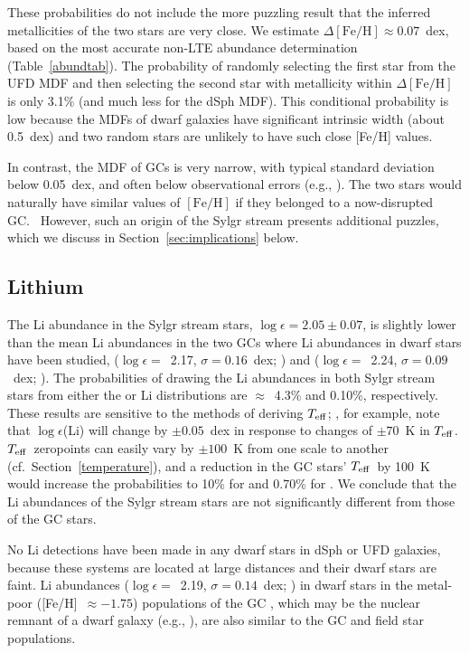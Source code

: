 \documentclass[twocolumn,tighten]{aastex62}
\newcommand{\feh}{{\mathrm{[Fe/H]}}}
\newcommand{\teff}{\mbox{$T_{\rm eff}$}}
\begin{document}
These probabilities do not include the more puzzling result that the inferred metallicities of the two stars are very close. We estimate $\Delta\feh \approx 0.07$~dex, based on the most accurate non-LTE abundance determination (Table~\ref{abundtab}). The probability of randomly selecting the first star from the UFD MDF and then selecting the second star with metallicity within $\Delta\feh$ is only 3.1\% (and much less for the dSph MDF).
This conditional probability is low because the MDFs of dwarf galaxies have significant intrinsic width (about 0.5~dex) and two random stars are unlikely to have such close [Fe/H] values.

In contrast, the MDF of GCs is very narrow, 
with typical standard deviation below 0.05~dex,
and often below observational errors
(e.g., \citealt{carretta09feh}). 
The two stars would naturally have similar values of $\feh$ 
if they belonged to a now-disrupted GC.~ 
However, such an origin of the Sylgr stream presents additional puzzles, which we discuss in Section~\ref{sec:implications} below.


\subsection{Lithium}
\label{clueslithium}


The Li abundance in the Sylgr stream stars,
$\log\epsilon = 2.05 \pm 0.07$,
is slightly lower than the mean Li abundances in the two 
GCs where Li abundances in dwarf stars have been studied,
($\log\epsilon =$~2.17, $\sigma = 0.16$~dex; \citealt{gruyters16})
and
($\log\epsilon =$~2.24, $\sigma = 0.09$~dex; \citealt{lind09n6397}).
The probabilities of drawing the Li abundances in both 
Sylgr stream stars from either the 
 or
Li distributions are $\approx$~4.3\% and 0.10\%, respectively.
These results are sensitive to the 
methods of deriving \teff;
\citet{charbonnel05}, for example, note that 
$\log\epsilon$(Li) will change by $\pm 0.05$~dex
in response to changes of $\pm 70$~K in \teff.
\teff\ zeropoints can easily vary by $\pm 100$~K 
from one scale to another
(cf.\ Section~\ref{temperature}), 
and a reduction in the GC stars' 
\teff\ by 100~K would increase the 
probabilities to 10\% for
 and 0.70\% for 
.
We conclude that the Li abundances of the Sylgr stream stars
are not significantly different from those of the GC stars.

No Li detections have been made in any 
dwarf stars in dSph or UFD galaxies,
because these systems are located at large distances
and their dwarf stars are faint.
Li abundances 
($\log\epsilon =$~2.19, $\sigma = 0.14$~dex; \citealt{monaco10})
in dwarf stars in the metal-poor
([Fe/H]~$\approx -1.75$) populations of the GC 
, which may be the 
nuclear remnant of a dwarf galaxy
(e.g., \citealt{bekki03,ibata19omegacen}), 
are also similar to the GC and field star populations.
\end{document}
